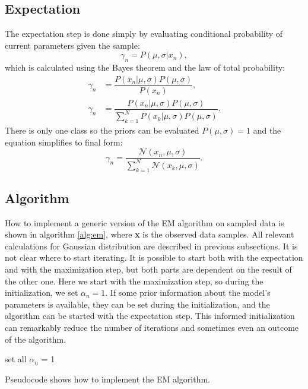\subsection{Expectation}
The expectation step is done simply by evaluating conditional probability of current parameters given the sample:
\begin{equation}
\gamma_n = P(\mu, \sigma | x_n),
\end{equation}
which is calculated using the Bayes theorem and the law of total probability:
\begin{align}
\gamma_n &= \dfrac{P(x_n | \mu, \sigma) P(\mu, \sigma)}{P(x_n)}, \\
\gamma_n &= \dfrac{P(x_n | \mu, \sigma) P(\mu, \sigma)}{\sum_{k = 1}^N P(x_k | \mu, \sigma) P(\mu, \sigma)}.
\end{align}
There is only one class so the priors can be evaluated $P(\mu, \sigma) = 1$ and the equation simplifies to final form:
\begin{equation}
\gamma_n = \dfrac{\mathcal{N}(x_n, \mu, \sigma) }{\sum_{k = 1}^N \mathcal{N}(x_k, \mu, \sigma) }.
\end{equation}

\subsection{Algorithm}
How to implement a generic version of the EM algorithm on sampled data is shown in algorithm \ref{alg:em}, where \textbf{x} is the observed data samples. All relevant calculations for Gaussian distribution are described in previous subsections. It is not clear where to start iterating. It is possible to start both with the expectation and with the maximization step, but both parts are dependent on the result of the other one. Here we start with the maximization step, so during the initialization, we set $\alpha_n = 1$. If some prior information about the model's parameters is available, they can be set during the initialization, and the algorithm can be started with the expectation step. This informed initialization can remarkably reduce the number of iterations and sometimes even an outcome of the algorithm.
\begin{algorithm}[]
 set all $\alpha_n$ = 1\;
 \caption{Pseudocode shows how to implement the EM algorithm.}
 \label{alg:em}
\end{algorithm}


